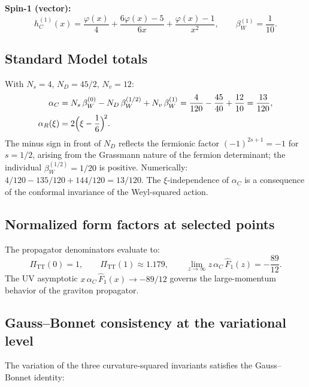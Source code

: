 \documentclass[12pt,a4paper]{article}
\newcommand{\PiTT}{\Pi_{\mathrm{TT}}}
\theoremstyle{plain}
\theoremstyle{definition}
\begin{document}
\noindent\textbf{Spin-1 (vector):}
\begin{equation}\label{eq:hC-vector}
  h_C^{(1)}(x) = \frac{\varphi(x)}{4}
  + \frac{6\varphi(x) - 5}{6x}
  + \frac{\varphi(x) - 1}{x^2},
  \qquad
  \beta_W^{(1)} = \frac{1}{10}.
\end{equation}

\subsection{Standard Model totals}

With $N_s = 4$, $N_D = 45/2$, $N_v = 12$:
\begin{align}
  \alpha_C &= N_s\,\beta_W^{(0)} - N_D\,\beta_W^{(1/2)}
  + N_v\,\beta_W^{(1)}
  = \frac{4}{120} - \frac{45}{40} + \frac{12}{10}
  = \frac{13}{120},
  \label{eq:alpha_C-check}\\
  \alpha_R(\xi) &= 2\Bigl(\xi - \frac{1}{6}\Bigr)^{\!2}.
  \label{eq:alpha_R-check}
\end{align}
The minus sign in front of $N_D$ reflects the fermionic factor
$(-1)^{2s+1} = -1$ for $s = 1/2$, arising from the Grassmann nature of
the fermion determinant; the individual $\beta_W^{(1/2)} = 1/20$
is positive.  Numerically: $4/120 - 135/120 + 144/120 = 13/120$.
The $\xi$-independence of $\alpha_C$ is a consequence of the conformal
invariance of the Weyl-squared action.

\subsection{Normalized form factors at selected points}

The propagator denominators evaluate to:
\begin{equation}\label{eq:PiTT-values}
  \PiTT(0) = 1,
  \qquad
  \PiTT(1) \approx 1.179,
  \qquad
  \lim_{z \to \infty} z\,\alpha_C\,\hat{F}_1(z)
  = -\frac{89}{12}.
\end{equation}
The UV asymptotic $x\,\alpha_C\,\hat{F}_1(x) \to -89/12$ governs the
large-momentum behavior of the graviton propagator.

\subsection{Gauss--Bonnet consistency at the variational level}

The variation of the three curvature-squared invariants satisfies the
Gauss--Bonnet identity:
\end{document}
